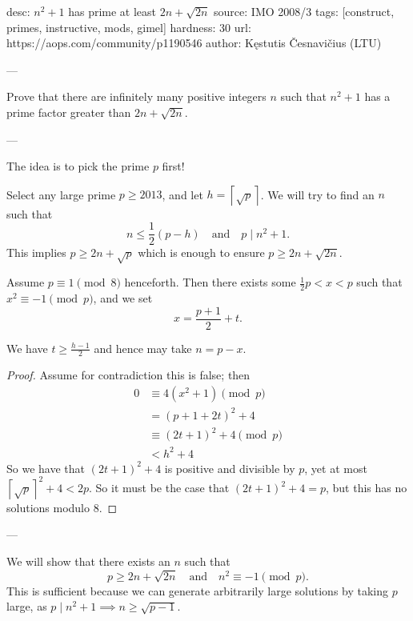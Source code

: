 desc:  $n^2+1$ has prime at least $2n+\sqrt{2n}$
source:  IMO 2008/3
tags:  [construct, primes, instructive, mods, gimel]
hardness: 30
url: https://aops.com/community/p1190546
author: Kęstutis Česnavičius (LTU)

---

Prove that there are infinitely many positive integers $n$
such that $n^2+1$ has a prime factor greater than $2n + \sqrt{2n}$.

---

The idea is to pick the prime $p$ first!

Select any large prime $p \ge 2013$,
and let $h = \left\lceil \sqrt p \right\rceil$.
We will try to find an $n$ such that
\[ n \le \frac 12 (p-h) \quad \text{and} \quad p \mid n^2+1. \]
This implies $p \ge 2n+\sqrt{p}$
which is enough to ensure $p \ge 2n + \sqrt{2n}$.

Assume $p \equiv 1 \pmod 8$ henceforth.
Then there exists some $\frac 12 p < x < p$
such that $x^2 \equiv -1 \pmod p$,
and we set \[ x = \frac{p+1}{2} + t. \]
\begin{claim*}
  We have $t \ge \frac{h-1}{2}$ and hence may take $n = p-x$.
\end{claim*}
\begin{proof}
Assume for contradiction this is false; then
\begin{align*}
  0 &\equiv  4(x^2+1) \pmod{p} \\
  &= \left( p+1+2t \right)^2 + 4 \\
  &\equiv (2t+1)^2 + 4 \pmod{p} \\
  &< h^2+4
\end{align*}
So we have that $(2t+1)^2+4$ is positive and divisible by $p$,
yet at most $\left\lceil \sqrt{p} \right\rceil^2 + 4 < 2p$.
So it must be the case that $(2t+1)^2+4 = p$,
but this has no solutions modulo $8$.
\end{proof}


---


We will show that there exists an $n$
such that
\[ p \ge 2n+\sqrt{2n} \quad\text{and}\quad n^2 \equiv -1 \pmod{p}. \]
This is sufficient because we can generate
arbitrarily large solutions by taking $p$ large,
as $p \mid n^2+1 \implies n \ge \sqrt{p-1}$.

